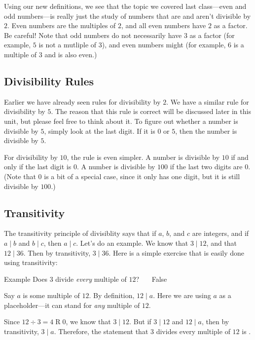 \documentclass[a4paper,10pt]{report}
\begin{document}
Using our new definitions, we see that the topic we covered last class---even
and odd numbers---is really just the study of numbers that are and aren't
divisible by $2$. Even numbers are the multiples of $2$, and all even numbers
have $2$ as a factor. Be careful! Note that odd numbers do not necessarily have
$3$ as a factor (for example, $5$ is not a mutliple of $3$), and even numbers
might (for example, $6$ is a multiple of $3$ and is also even.)

\subsection{Divisibility Rules}

Earlier we have already seen rules for divisibility by $2$. We have a similar
rule for divisibility by $5$. The reason that this rule is correct will be
discussed later in this unit, but please feel free to think about it. To figure
out whether a number is divisible by $5$, simply look at the last digit. If it
is $0$ or $5$, then the number is divisible by $5$.

For divisibility by $10$, the rule is even simpler. A number is divisible by
$10$ if and only if the last digit is $0$. A number is divisible by $100$ if the
last two digits are $0$. (Note that $0$ is a bit of a special case, since it
only has one digit, but it is still divisible by $100$.)

\subsection{Transitivity}

The \gls{transitivity} principle of divisiblity says that if $a$, $b$, and $c$
are integers, and if $a \mid b$ and $b \mid c$, then $a \mid c$. Let's do an
example. We know that $3 \mid 12$, and that $12 \mid 36$. Then by transitivity,
$3 \mid 36$. Here is a simple exercise that is easily done using transitivity:

\begin{problem}{Example}
 Does $3$ divide \emph{every} multiple of $12$? \hfill {}~~~False

 \begin{solution}
  Say $a$ is some multiple of $12$. By definition, $12 \mid a$. Here we are
  using $a$ as a placeholder---it can stand for \emph{any} multiple of $12$.

  Since $12 \div 3 = 4 \operatorname{R} 0$, we know that $3 \mid 12$. But if $3
  \mid 12$ and $12 \mid a$, then by transitivity, $3 \mid a$. Therefore, the
  statement that $3$ divides every multiple of $12$ is .
 \end{solution}
\end{problem}
\end{document}
